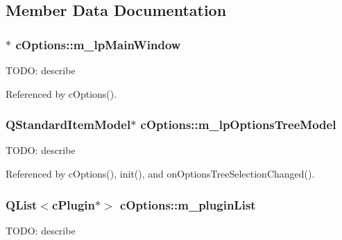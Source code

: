 \subsection{Member Data Documentation}
\subsubsection[{\texorpdfstring{m\+\_\+lp\+Main\+Window}{m_lpMainWindow}}]{$\ast$ c\+Options\+::m\+\_\+lp\+Main\+Window\hspace{0.3cm}{\ttfamily [private]}}\hypertarget{classc_options_a19b1ed8dd34f5fcde6dd4ac6167f3b42}{}\label{classc_options_a19b1ed8dd34f5fcde6dd4ac6167f3b42}
T\+O\+DO\+: describe 

Referenced by c\+Options().

\subsubsection[{\texorpdfstring{m\+\_\+lp\+Options\+Tree\+Model}{m_lpOptionsTreeModel}}]{\setlength{\rightskip}{0pt plus 5cm}Q\+Standard\+Item\+Model$\ast$ c\+Options\+::m\+\_\+lp\+Options\+Tree\+Model\hspace{0.3cm}{\ttfamily [private]}}\hypertarget{classc_options_a6f83c5dacdeb7901b900b826640a5f1d}{}\label{classc_options_a6f83c5dacdeb7901b900b826640a5f1d}
T\+O\+DO\+: describe 

Referenced by c\+Options(), init(), and on\+Options\+Tree\+Selection\+Changed().

\subsubsection[{\texorpdfstring{m\+\_\+plugin\+List}{m_pluginList}}]{\setlength{\rightskip}{0pt plus 5cm}Q\+List$<${\bf c\+Plugin}$\ast$$>$ c\+Options\+::m\+\_\+plugin\+List\hspace{0.3cm}{\ttfamily [private]}}\hypertarget{classc_options_a9891a847c04b7581120a51989ff73328}{}\label{classc_options_a9891a847c04b7581120a51989ff73328}
T\+O\+DO\+: describe 

